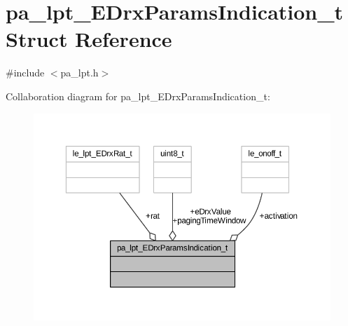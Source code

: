 \hypertarget{structpa__lpt___e_drx_params_indication__t}{}\section{pa\+\_\+lpt\+\_\+\+E\+Drx\+Params\+Indication\+\_\+t Struct Reference}
\label{structpa__lpt___e_drx_params_indication__t}


{\ttfamily \#include $<$pa\+\_\+lpt.\+h$>$}



Collaboration diagram for pa\+\_\+lpt\+\_\+\+E\+Drx\+Params\+Indication\+\_\+t\+:
\nopagebreak
\begin{figure}[H]
\begin{center}
\leavevmode
\includegraphics[width=350pt]{structpa__lpt___e_drx_params_indication__t__coll__graph}
\end{center}
\end{figure}
